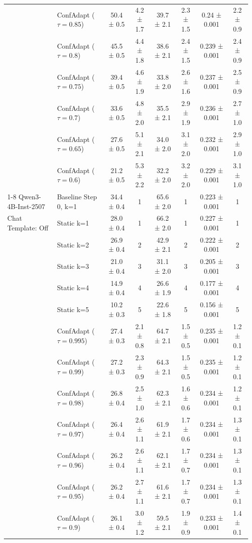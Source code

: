 \documentclass{article}
\theoremstyle{plain}
\theoremstyle{definition}
\theoremstyle{remark}
\begin{document}
\begin{table}[h!]
\begin{tabular}{llcccccc}
 & ConfAdapt ($\tau=0.85$) & 50.4 ± 0.5 & 4.2 ± 1.7 & 39.7 ± 2.1 & 2.3 ± 1.5 & 0.24 ± 0.001 & 2.2 ± 0.9 \\
 & ConfAdapt ($\tau=0.8$) & 45.5 ± 0.5 & 4.4 ± 1.8 & 38.6 ± 2.1 & 2.4 ± 1.5 & 0.239 ± 0.001 & 2.4 ± 0.9 \\
 & ConfAdapt ($\tau=0.75$) & 39.4 ± 0.5 & 4.6 ± 1.9 & 33.8 ± 2.0 & 2.6 ± 1.6 & 0.237 ± 0.001 & 2.5 ± 0.9 \\
 & ConfAdapt ($\tau=0.7$) & 33.6 ± 0.5 & 4.8 ± 2.0 & 35.5 ± 2.1 & 2.9 ± 1.9 & 0.236 ± 0.001 & 2.7 ± 1.0 \\
 & ConfAdapt ($\tau=0.65$) & 27.6 ± 0.5 & 5.1 ± 2.1 & 34.0 ± 2.0 & 3.1 ± 2.0 & 0.232 ± 0.001 & 2.9 ± 1.0 \\
 & ConfAdapt ($\tau=0.6$) & 21.2 ± 0.5 & 5.3 ± 2.2 & 32.2 ± 2.0 & 3.2 ± 2.0 & 0.229 ± 0.001 & 3.1 ± 1.0 \\
\cline{1-8}
Qwen3-4B-Inst-2507 & Baseline Step 0, k=1 & 34.4 ± 0.4 & 1 & 65.6 ± 2.0 & 1 & 0.223 ± 0.001 & 1 \\
 Chat Template: Off & Static k=1 & 28.0 ± 0.4 & 1 & 66.2 ± 2.0 & 1 & 0.227 ± 0.001 & 1 \\
 & Static k=2 & 26.9 ± 0.4 & 2 & 42.9 ± 2.1 & 2 & 0.222 ± 0.001 & 2 \\
 & Static k=3 & 21.0 ± 0.4 & 3 & 31.1 ± 2.0 & 3 & 0.205 ± 0.001 & 3 \\
 & Static k=4 & 14.9 ± 0.4 & 4 & 26.6 ± 1.9 & 4 & 0.177 ± 0.001 & 4 \\
 & Static k=5 & 10.2 ± 0.3 & 5 & 22.6 ± 1.8 & 5 & 0.156 ± 0.001 & 5 \\
 & ConfAdapt ($\tau=0.995$) & 27.4 ± 0.3 & 2.1 ± 0.8 & 64.7 ± 2.1 & 1.5 ± 0.5 & 0.235 ± 0.001 & 1.2 ± 0.1 \\
 & ConfAdapt ($\tau=0.99$) & 27.2 ± 0.3 & 2.3 ± 0.9 & 64.3 ± 2.1 & 1.5 ± 0.5 & 0.235 ± 0.001 & 1.2 ± 0.1 \\
 & ConfAdapt ($\tau=0.98$) & 26.8 ± 0.4 & 2.5 ± 1.0 & 62.3 ± 2.1 & 1.6 ± 0.6 & 0.234 ± 0.001 & 1.2 ± 0.1 \\
 & ConfAdapt ($\tau=0.97$) & 26.4 ± 0.4 & 2.6 ± 1.1 & 61.9 ± 2.1 & 1.7 ± 0.6 & 0.234 ± 0.001 & 1.3 ± 0.1 \\
 & ConfAdapt ($\tau=0.96$) & 26.2 ± 0.4 & 2.6 ± 1.1 & 62.1 ± 2.1 & 1.7 ± 0.7 & 0.234 ± 0.001 & 1.3 ± 0.1 \\
 & ConfAdapt ($\tau=0.95$) & 26.2 ± 0.4 & 2.7 ± 1.1 & 61.6 ± 2.1 & 1.7 ± 0.7 & 0.234 ± 0.001 & 1.3 ± 0.1 \\
 & ConfAdapt ($\tau=0.9$) & 26.1 ± 0.4 & 3.0 ± 1.2 & 59.5 ± 2.1 & 1.9 ± 0.9 & 0.233 ± 0.001 & 1.4 ± 0.1 \\

\end{tabular}
\end{table}
\end{document}
